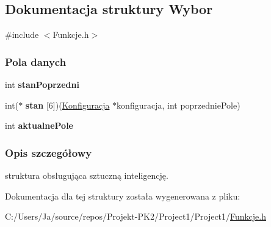 \hypertarget{structWybor}{}\subsection{Dokumentacja struktury Wybor}
\label{structWybor}


{\ttfamily \#include $<$Funkcje.\+h$>$}

\subsubsection*{Pola danych}
\begin{DoxyCompactItemize}
\item 
\mbox{\label{structWybor_a2e7f0e72895dc61721d4dd30123e0336}} 
int {\bfseries stan\+Poprzedni}
\item 
\mbox{\label{structWybor_a7cfd95e60cfc28a94f8570ab94e46b2d}} 
int($\ast$ {\bfseries stan} \mbox{[}6\mbox{]})(\mbox{\hyperlink{structKonfiguracja}{Konfiguracja}} $\ast$konfiguracja, int poprzednie\+Pole)
\item 
\mbox{\label{structWybor_af8cbf82b7ea11bbc708d4b17e0287a29}} 
int {\bfseries aktualne\+Pole}
\end{DoxyCompactItemize}


\subsubsection{Opis szczegółowy}
struktura obsługująca sztuczną inteligencję. 

Dokumentacja dla tej struktury została wygenerowana z pliku\+:\begin{DoxyCompactItemize}
\item 
C\+:/\+Users/\+Ja/source/repos/\+Projekt-\/\+P\+K2/\+Project1/\+Project1/\mbox{\hyperlink{Funkcje_8h}{Funkcje.\+h}}\end{DoxyCompactItemize}
